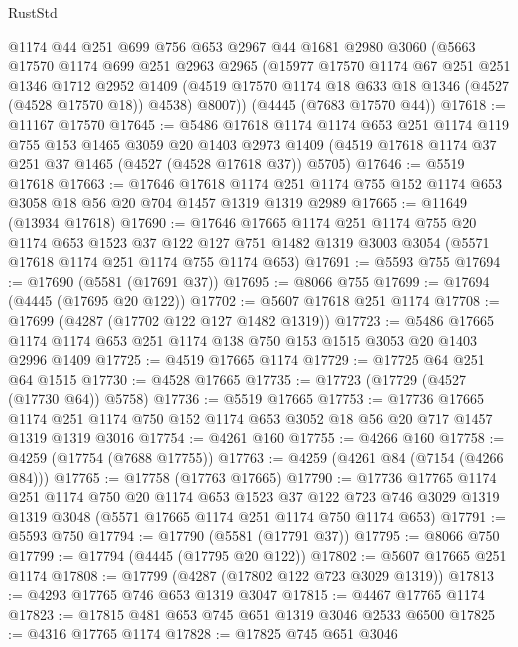 \begin{lexlean}{RustStd}
\begin{coremodule}
    @1174
    @44
    @251
    @699
    @756
    @653
    @2967
    @44
    @1681
    @2980
    @3060
    (@5663
      @17570
      @1174
      @699
      @251
      @2963
      @2965
      (@15977
        @17570
        @1174
        @67
        @251
        @251
        @1346
        @1712
        @2952
        @1409
        (@4519 @17570 @1174 @18 @633 @18 @1346 (@4527 (@4528 @17570 @18)) @4538)
        @8007))
    (@4445 (@7683 @17570 @44))
@17618 := @11167 @17570
@17645 := @5486
    @17618
    @1174
    @1174
    @653
    @251
    @1174
    @119
    @755
    @153
    @1465
    @3059
    @20
    @1403
    @2973
    @1409
    (@4519 @17618 @1174 @37 @251 @37 @1465 (@4527 (@4528 @17618 @37)) @5705)
@17646 := @5519 @17618
@17663 := @17646
    @17618
    @1174
    @251
    @1174
    @755
    @152
    @1174
    @653
    @3058
    @18
    @56
    @20
    @704
    @1457
    @1319
    @1319
    @2989
@17665 := @11649 (@13934 @17618)
@17690 := @17646
    @17665
    @1174
    @251
    @1174
    @755
    @20
    @1174
    @653
    @1523
    @37
    @122
    @127
    @751
    @1482
    @1319
    @3003
    @3054
    (@5571 @17618 @1174 @251 @1174 @755 @1174 @653)
@17691 := @5593 @755
@17694 := @17690 (@5581 (@17691 @37))
@17695 := @8066 @755
@17699 := @17694 (@4445 (@17695 @20 @122))
@17702 := @5607 @17618 @251 @1174
@17708 := @17699 (@4287 (@17702 @122 @127 @1482 @1319))
@17723 := @5486 @17665 @1174 @1174 @653 @251 @1174 @138 @750 @153 @1515 @3053 @20 @1403 @2996 @1409
@17725 := @4519 @17665 @1174
@17729 := @17725 @64 @251 @64 @1515
@17730 := @4528 @17665
@17735 := @17723 (@17729 (@4527 (@17730 @64)) @5758)
@17736 := @5519 @17665
@17753 := @17736
    @17665
    @1174
    @251
    @1174
    @750
    @152
    @1174
    @653
    @3052
    @18
    @56
    @20
    @717
    @1457
    @1319
    @1319
    @3016
@17754 := @4261 @160
@17755 := @4266 @160
@17758 := @4259 (@17754 (@7688 @17755))
@17763 := @4259 (@4261 @84 (@7154 (@4266 @84)))
@17765 := @17758 (@17763 @17665)
@17790 := @17736
    @17765
    @1174
    @251
    @1174
    @750
    @20
    @1174
    @653
    @1523
    @37
    @122
    @723
    @746
    @3029
    @1319
    @1319
    @3048
    (@5571 @17665 @1174 @251 @1174 @750 @1174 @653)
@17791 := @5593 @750
@17794 := @17790 (@5581 (@17791 @37))
@17795 := @8066 @750
@17799 := @17794 (@4445 (@17795 @20 @122))
@17802 := @5607 @17665 @251 @1174
@17808 := @17799 (@4287 (@17802 @122 @723 @3029 @1319))
@17813 := @4293 @17765 @746 @653 @1319 @3047
@17815 := @4467 @17765 @1174
@17823 := @17815 @481 @653 @745 @651 @1319 @3046 @2533 @6500
@17825 := @4316 @17765 @1174
@17828 := @17825 @745 @651 @3046

\end{coremodule}
\end{lexlean}

